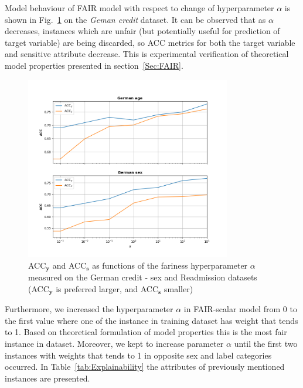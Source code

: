 \documentclass[preprint,12pt]{elsarticle}
\begin{document}
Model behaviour of FAIR model with respect to change of hyperparameter $\alpha$ is shown in Fig.~\ref{fig:FigResultsAlpha} on the \textit{Geman credit} dataset. It can be observed that as $\alpha$ decreases, instances which are unfair (but potentially useful for prediction of target variable) are being discarded, so ACC metrics for both the target variable and sensitive attribute decrease. This is experimental verification of theoretical model properties presented in section~\ref{Sec:FAIR}.

\begin{figure}[h]
	\center
	\includegraphics[angle=0, width=0.8\textwidth]{AUC_y_A.png}
	\captionsetup{justification=centering}
	\caption{ACC$_\mathbf{y}$ and ACC$_\mathbf{s}$ as functions of the fariness hyperparameter $\alpha$ measured on the German credit - sex and Readmission datasets (ACC$_\mathbf{y}$ is preferred larger, and ACC$_\mathbf{s}$ smaller)}
	\label{fig:FigResultsAlpha}
\end{figure}

Furthermore, we increased the hyperparameter $\alpha$ in FAIR-scalar model from 0 to the first value where one of the instance in training dataset has weight that tends to 1. Based on theoretical formulation of model properties this is the most fair instance in dataset. Moreover, we kept to increase parameter $\alpha$ until the first two instances with weights that tends to 1 in opposite sex and label categories occurred. In Table~\ref{tab:Explainability} the attributes of previously mentioned instances are presented.
\end{document}
